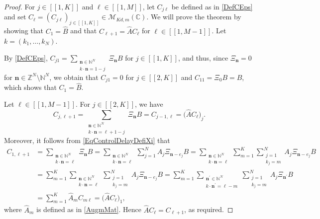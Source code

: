 \documentclass[JEP,XML,SOM,Unicode]{cedram}
\newcommand{\bn}{\boldsymbol{n}}
\newcommand{\llbracket}{[\![}
\newcommand{\rrbracket}{]\!]}
\theoremstyle{plain}
\theoremstyle{definition}
\begin{document}
\begin{proof}
For $j \in \llbracket 1, K\rrbracket$ and $\ell \in \llbracket 1, M\rrbracket$, let $C_{j\ell}$ be defined as in \eqref{DefCEps} and set $C_\ell = \left(C_{j\ell}\right)_{j \in \llbracket 1, K\rrbracket} \in \mathcal M_{Kd, m}(\mathbb C)$. We will prove the theorem by showing that $C_1 = \widehat B$ and that $C_{\ell + 1} = \widehat A C_\ell$ for $\ell \in \llbracket 1, M-1\rrbracket$. Let $k = (k_1, \dots, k_N)$.

By \eqref{DefCEps}, $C_{j1} = \sum_{\substack{\bn \in \mathbb N^N \\ k \cdot \bn = 1 - j}} \Xi_{\bn} B$ for $j \in \llbracket 1, K\rrbracket$, and thus, since $\Xi_{\bn} = 0$ for $\bn \in \mathbb Z^N \setminus \mathbb N^N$, we obtain that $C_{j1} = 0$ for $j \in \llbracket 2, K\rrbracket$ and $C_{11} = \Xi_{0} B = B$, which shows that $C_1 = \widehat B$.

Let $\ell \in \llbracket 1, M-1\rrbracket$. For $j \in \llbracket 2, K\rrbracket$, we have
\[
C_{j, \ell + 1} = \sum_{\substack{\bn \in \mathbb N^N \\ k \cdot \bn = \ell + 1 - j}} \Xi_{\bn} B = C_{j-1, \ell} =\bigl(\widehat A C_{\ell}\bigr)_j.
\]
Moreover, it follows from \eqref{EqControlDelayDefiXi} that
\begin{align*}
C_{1, \ell + 1} & = \sum_{\substack{\bn \in \mathbb N^N \\ k \cdot \bn = \ell}} \Xi_{\bn} B = \sum_{\substack{\bn \in \mathbb N^N \\ k \cdot \bn = \ell}} \sum_{j=1}^N A_j \Xi_{\bn - e_j} B {} = \sum_{\substack{\bn \in \mathbb N^N \\ k \cdot \bn = \ell}} \sum_{m=1}^K \sum_{\substack{j=1 \\ k_j = m}}^N A_j \Xi_{\bn - e_j} B  \\
& = \sum_{m=1}^K \sum_{\substack{\bn \in \mathbb N^N \\ k \cdot \bn = \ell}} \sum_{\substack{j=1 \\ k_j = m}}^N A_j \Xi_{\bn - e_j} B = \sum_{m=1}^K \sum_{\substack{\bn^\prime \in \mathbb N^N \\ k \cdot \bn^\prime = \ell - m}} \sum_{\substack{j=1 \\ k_j = m}}^N A_j \Xi_{\bn^\prime} B\\& = \sum_{m=1}^K \widehat A_m C_{m\ell} = \bigl(\widehat A C_{\ell}\bigr)_1,
\end{align*}
where $\widehat A_m$ is defined as in \eqref{AugmMat}. Hence $\widehat A C_\ell = C_{\ell + 1}$, as required.
\end{proof}
\end{document}
